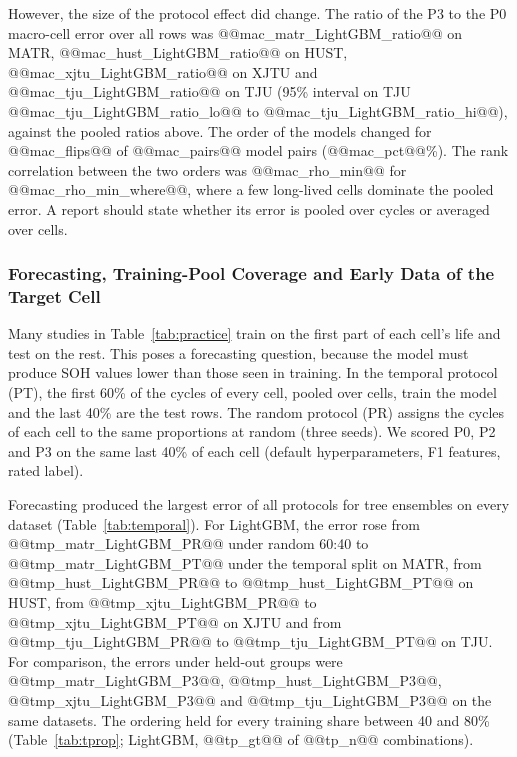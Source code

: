 \documentclass{ieeeaccess}
\newcommand{\fitcol}[1]{\footnotesize\resizebox{\ifdim\width>\columnwidth\columnwidth\else\width\fi}{!}{}}
\newcommand{\fitwide}[1]{\footnotesize\resizebox{\ifdim\width>\textwidth\textwidth\else\width\fi}{!}{}}
\begin{document}
However, the size of the protocol effect did change. The ratio of the P3 to the P0 macro-cell error over all rows was @@mac_matr_LightGBM_ratio@@ on MATR, @@mac_hust_LightGBM_ratio@@ on HUST, @@mac_xjtu_LightGBM_ratio@@ on XJTU and @@mac_tju_LightGBM_ratio@@ on TJU (95\% interval on TJU @@mac_tju_LightGBM_ratio_lo@@ to @@mac_tju_LightGBM_ratio_hi@@), against the pooled ratios above. The order of the models changed for @@mac_flips@@ of @@mac_pairs@@ model pairs (@@mac_pct@@\%). The rank correlation between the two orders was @@mac_rho_min@@ for @@mac_rho_min_where@@, where a few long-lived cells dominate the pooled error. A report should state whether its error is pooled over cycles or averaged over cells.
\begin{table}[!t]
\centering
\caption{Pooled and macro-cell RMSE (\% SOH) on the last 40\% of each cell for LightGBM, ridge regression and the GRU. Spearman: rank correlation between the orders of the models under the two metrics; pairs flipped: model pairs whose order differs (of 28 pairs for P0 and 91 for the other questions).}
\label{tab:macro}
\scriptsize
\fitwide{tables/macro.tex}
\end{table}

\subsubsection{Forecasting, Training-Pool Coverage and Early Data of the Target Cell}
\label{sec:res_temporal}
\label{sec:res_factorial}
Many studies in Table~\ref{tab:practice} train on the first part of each cell's life and test on the rest. This poses a forecasting question, because the model must produce SOH values lower than those seen in training. In the temporal protocol (PT), the first 60\% of the cycles of every cell, pooled over cells, train the model and the last 40\% are the test rows. The random protocol (PR) assigns the cycles of each cell to the same proportions at random (three seeds). We scored P0, P2 and P3 on the same last 40\% of each cell (default hyperparameters, F1 features, rated label).
\begin{table}[!tb]
\caption{Pooled RMSE (\% SOH): random and temporal 60:40 splits within cells, and P0, P2 and P3 scored on the last 40\% of each cell (the temporal test rows). Default hyperparameters, F1 features, rated label.}
\label{tab:temporal}
\centering
\fitcol{tables/temporal.tex}
\end{table}

Forecasting produced the largest error of all protocols for tree ensembles on every dataset (Table~\ref{tab:temporal}). For LightGBM, the error rose from @@tmp_matr_LightGBM_PR@@ under random 60:40 to @@tmp_matr_LightGBM_PT@@ under the temporal split on MATR, from @@tmp_hust_LightGBM_PR@@ to @@tmp_hust_LightGBM_PT@@ on HUST, from @@tmp_xjtu_LightGBM_PR@@ to @@tmp_xjtu_LightGBM_PT@@ on XJTU and from @@tmp_tju_LightGBM_PR@@ to @@tmp_tju_LightGBM_PT@@ on TJU. For comparison, the errors under held-out groups were @@tmp_matr_LightGBM_P3@@, @@tmp_hust_LightGBM_P3@@, @@tmp_xjtu_LightGBM_P3@@ and @@tmp_tju_LightGBM_P3@@ on the same datasets. The ordering held for every training share between 40 and 80\% (Table~\ref{tab:tprop}; LightGBM, @@tp_gt@@ of @@tp_n@@ combinations).
\end{document}
